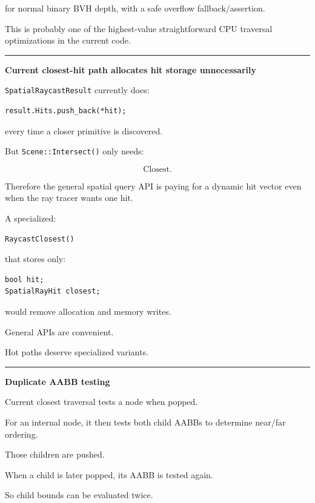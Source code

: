 for normal binary BVH depth, with a safe overflow fallback/assertion.

This is probably one of the highest-value straightforward CPU traversal optimizations in the current code.

\begin{center}\rule{0.5\linewidth}{0.5pt}\end{center}

\textbf{Current closest-hit path allocates hit storage unnecessarily}

\texttt{SpatialRaycastResult} currently does:

\begin{verbatim}
result.Hits.push_back(*hit);
\end{verbatim}

every time a closer primitive is discovered.

But \texttt{Scene::Intersect()} only needs:

\[
\text{Closest}.
\]

Therefore the general spatial query API is paying for a dynamic hit vector even when the ray tracer wants one hit.

A specialized:

\begin{verbatim}
RaycastClosest()
\end{verbatim}

that stores only:

\begin{verbatim}
bool hit;
SpatialRayHit closest;
\end{verbatim}

would remove allocation and memory writes.

General APIs are convenient.

Hot paths deserve specialized variants.

\begin{center}\rule{0.5\linewidth}{0.5pt}\end{center}

\textbf{Duplicate AABB testing}

Current closest traversal tests a node when popped.

For an internal node, it then tests both child AABBs to determine near/far ordering.

Those children are pushed.

When a child is later popped, its AABB is tested again.

So child bounds can be evaluated twice.

